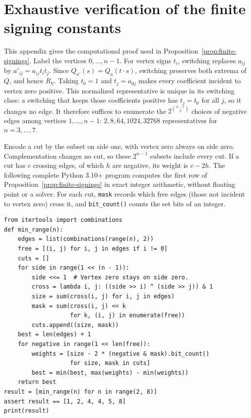 \section{Exhaustive verification of the finite signing constants}
\label{app:finite-signings}
This appendix gives the computational proof used in
Proposition~\ref{prop:finite-signings}. Label the vertices $0,\ldots,n-1$.
For vertex signs $t_i$, switching replaces $a_{ij}$ by
$a'_{ij}=a_{ij}t_it_j$. Since $Q_{a'}(s)=Q_a(t\cdot s)$, switching
preserves both extrema of $Q$, and hence $R_V$.
Taking $t_0=1$ and $t_j=a_{0j}$ makes every coefficient incident to
vertex zero positive. This normalized representative is unique in its
switching class: a switching that keeps those coefficients positive has
$t_j=t_0$ for all $j$, so it changes no edge. It therefore suffices to
enumerate the $2^{\binom{n-1}{2}}$ choices of negative edges among
vertices $1,\ldots,n-1$: $2,8,64,1024,32768$ representatives for
$n=3,\ldots,7$.

Encode a cut by the subset on side one, with vertex zero always on
side zero. Complementation changes no cut, so these $2^{n-1}$ subsets
include every cut. If a cut has $c$ crossing edges, of which $h$ are
negative, its weight is $c-2h$. The following complete Python 3.10+
program computes the first row of Proposition~\ref{prop:finite-signings}
in exact integer arithmetic, without floating point or a solver. For each
cut, \texttt{mask} records which free edges (those not incident to vertex
zero) cross it, and \texttt{bit\_count()} counts the set bits of an
integer.

\begin{small}
\begin{verbatim}
from itertools import combinations
def min_range(n):
    edges = list(combinations(range(n), 2))
    free = [(i, j) for i, j in edges if i != 0]
    cuts = []
    for side in range(1 << (n - 1)):
        side <<= 1  # Vertex zero stays on side zero.
        cross = lambda i, j: ((side >> i) ^ (side >> j)) & 1
        size = sum(cross(i, j) for i, j in edges)
        mask = sum(cross(i, j) << k
                   for k, (i, j) in enumerate(free))
        cuts.append((size, mask))
    best = len(edges) + 1
    for negative in range(1 << len(free)):
        weights = [size - 2 * (negative & mask).bit_count()
                   for size, mask in cuts]
        best = min(best, max(weights) - min(weights))
    return best
result = [min_range(n) for n in range(2, 8)]
assert result == [1, 2, 4, 4, 5, 8]
print(result)
\end{verbatim}
\end{small}

